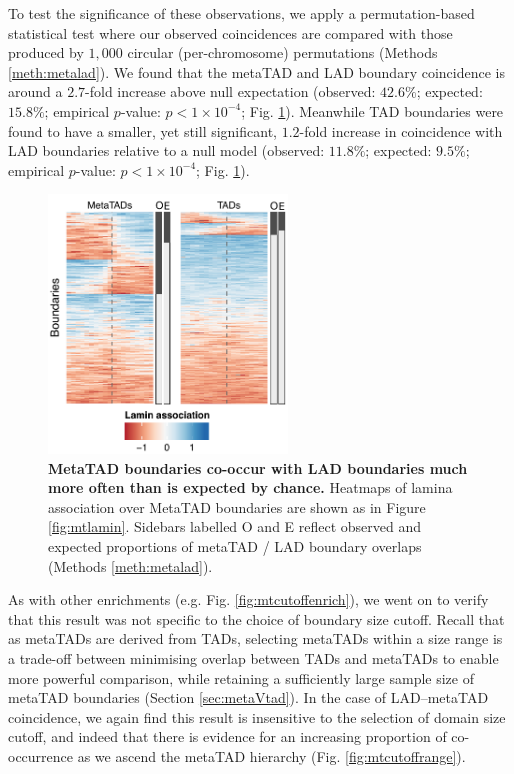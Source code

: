 \documentclass[a4paper,11pt,oneside]{book}
\begin{document}
To test the significance of these observations, we apply a permutation-based statistical test where our observed coincidences are compared with those produced by $1,000$ circular (per-chromosome) permutations (Methods \ref{meth:metalad}). We found that the metaTAD and LAD boundary coincidence is around a $2.7$-fold increase above null expectation (observed: $42.6\%$; expected: $15.8\%$; empirical $p$-value: $p < 1 \times 10^{-4}$; Fig. \ref{fig:mtsummary}). Meanwhile TAD boundaries were found to have a smaller, yet still significant, $1.2$-fold increase in coincidence with LAD boundaries relative to a null model (observed: $11.8\%$; expected: $9.5\%$; empirical $p$-value: $p < 1 \times 10^{-4}$; Fig. \ref{fig:mtsummary}).

\begin{figure}
\begin{center} 
\includegraphics[width=2.5in]{figs/mt_laminsummary.pdf}
\captionsetup{width=\textwidth}
\caption[ MetaTAD boundaries co-occur with LAD boundaries much more often than is expected by chance. ]{ {\bf MetaTAD boundaries co-occur with LAD boundaries much more often than is expected by chance. }
Heatmaps of lamina association over MetaTAD boundaries are shown as in Figure \ref{fig:mtlamin}. Sidebars labelled O and E reflect observed and expected proportions of metaTAD / LAD boundary overlaps (Methods \ref{meth:metalad}).
}\label{fig:mtsummary}
\end{center}
\end{figure} 

As with other enrichments (e.g. Fig. \ref{fig:mtcutoffenrich}), we went on to verify that this result was not specific to the choice of boundary size cutoff. Recall that as metaTADs are derived from TADs, selecting metaTADs within a size range is a trade-off between minimising overlap between TADs and metaTADs to enable more powerful comparison, while retaining a sufficiently large sample size of metaTAD boundaries (Section \ref{sec:metaVtad}). In the case of LAD--metaTAD coincidence, we again find this result is insensitive to the selection of domain size cutoff, and indeed that there is evidence for an increasing proportion of co-occurrence as we ascend the metaTAD hierarchy (Fig. \ref{fig:mtcutoffrange}).
\end{document}
